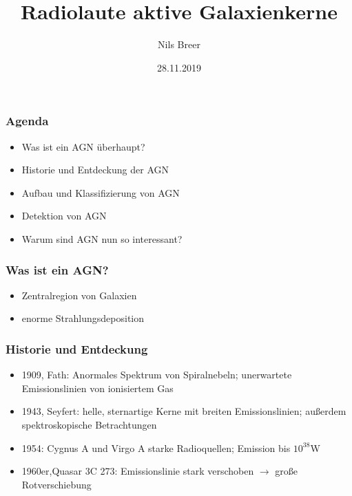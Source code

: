 \documentclass[aspectratio=1610, 9pt]{beamer}
\title{Radiolaute aktive Galaxienkerne}
\author[N.Breer]{Nils Breer}
\institute{Fakultät Physik}
\date{28.11.2019}
\begin{document}
\maketitle

\begin{frame}\frametitle{Agenda}
  \begin{itemize}
    \item Was ist ein AGN \"uberhaupt?
    \item Historie und Entdeckung der AGN
    \item Aufbau und Klassifizierung von AGN
    \item Detektion von AGN
    \item Warum sind AGN nun so interessant?
  \end{itemize}
\end{frame}

\begin{frame}\frametitle{Was ist ein AGN?}
  \begin{itemize}
    \item Zentralregion von Galaxien
    \item enorme Strahlungsdeposition
  \end{itemize}
\end{frame}

\begin{frame}\frametitle{Historie und Entdeckung}
  \begin{itemize}
    \item 1909, Fath: Anormales Spektrum von Spiralnebeln; unerwartete Emissionslinien von ionisiertem Gas
    \item 1943, Seyfert: helle, sternartige Kerne mit breiten Emissionslinien; au\ss erdem spektroskopische Betrachtungen
    \item 1954: Cygnus A und Virgo A starke Radioquellen; Emission bis $10^{38}$W
    \item 1960er,Quasar 3C 273: Emissionslinie stark verschoben $\to$ gro\ss e Rotverschiebung
  \end{itemize}
\end{frame}

\end{document}
